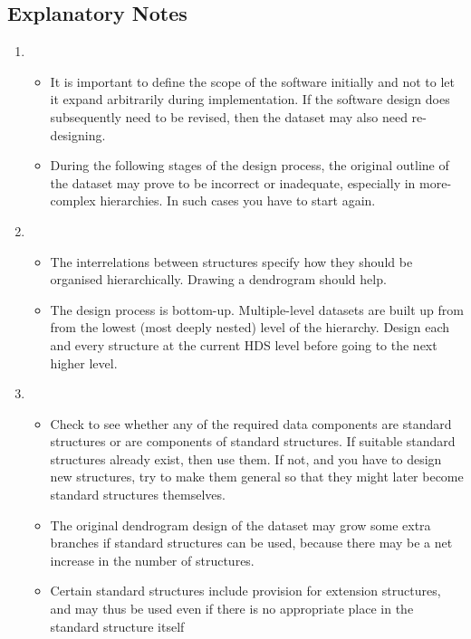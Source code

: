 \documentclass[twoside,11pt,nolof,noabs]{starlink}
\begin{document}
\subsection{Explanatory Notes\label{se:newexn}}

\begin{enumerate}
\html{\label{se:expnote1}}
\item
\begin{itemize}
\item
It is important to define the scope of the software initially and not to
let it expand arbitrarily during implementation.  If the software design
does subsequently need to be revised, then the dataset may also need
re-designing.
\item
During the following stages of the design process, the original outline of
the dataset may prove to be incorrect or inadequate, especially in
more-complex hierarchies.  In such cases you have to start again.
\end{itemize}
\html{\label{se:expnote2}}
\item
\begin{itemize}
\item
The interrelations between structures specify how they should be
organised hierarchically.  Drawing a dendrogram should help.
\item
The design process is bottom-up.
Multiple-level datasets are built up from from the lowest (most deeply
nested) level of the hierarchy.  Design each and every structure at
the current HDS level before going to the next higher level.
\end{itemize}
\html{\label{se:expnote3}}
\item
\begin{itemize}
\item
Check to see whether any of the required data components
are standard structures or are components of standard
structures.  If suitable standard
structures already exist, then use them.
If not, and you have to design new structures, try to make
them general so that they might later become
standard structures themselves.
\item
The original dendrogram design of the dataset may grow some
extra branches if standard structures can be used, because
there may be a net increase in the number of structures.
\item
Certain standard structures include provision for extension
structures, and may thus
be used even if there is no
appropriate place in the standard structure itself

\end{itemize}
\end{enumerate}
\end{document}
